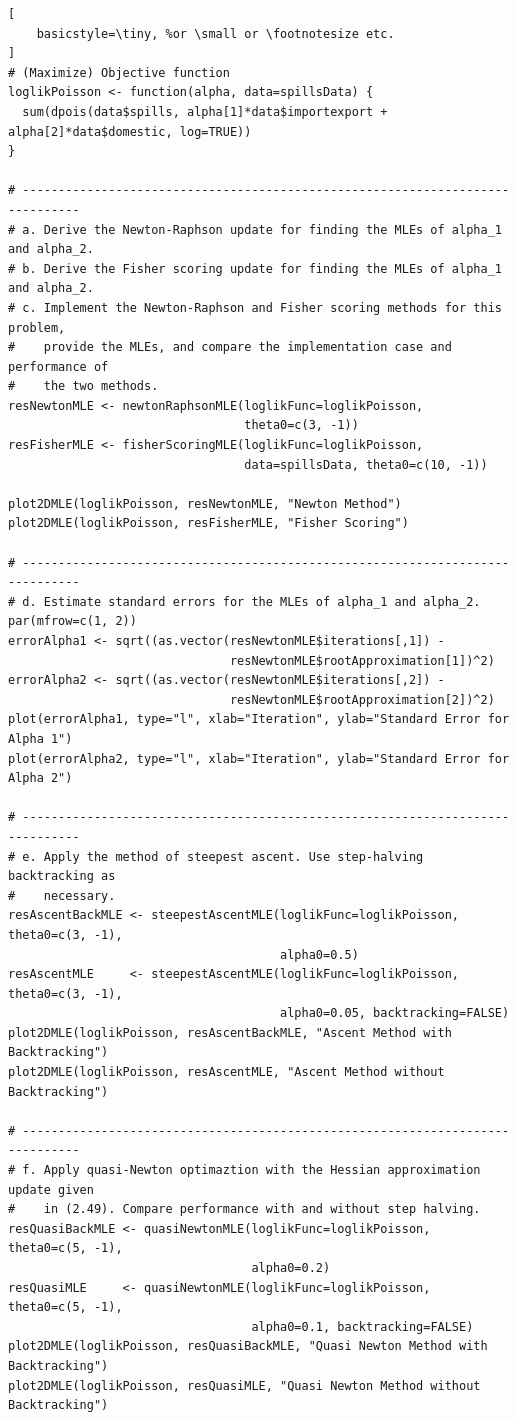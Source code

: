 \begin{appendices}
\begin{lstlisting}[
	basicstyle=\tiny, %or \small or \footnotesize etc.
]
# (Maximize) Objective function
loglikPoisson <- function(alpha, data=spillsData) {
  sum(dpois(data$spills, alpha[1]*data$importexport + alpha[2]*data$domestic, log=TRUE))
}

# ------------------------------------------------------------------------------
# a. Derive the Newton-Raphson update for finding the MLEs of alpha_1 and alpha_2.
# b. Derive the Fisher scoring update for finding the MLEs of alpha_1 and alpha_2.
# c. Implement the Newton-Raphson and Fisher scoring methods for this problem, 
#    provide the MLEs, and compare the implementation case and performance of 
#    the two methods.
resNewtonMLE <- newtonRaphsonMLE(loglikFunc=loglikPoisson, 
                                 theta0=c(3, -1))
resFisherMLE <- fisherScoringMLE(loglikFunc=loglikPoisson, 
                                 data=spillsData, theta0=c(10, -1))

plot2DMLE(loglikPoisson, resNewtonMLE, "Newton Method")
plot2DMLE(loglikPoisson, resFisherMLE, "Fisher Scoring")

# ------------------------------------------------------------------------------
# d. Estimate standard errors for the MLEs of alpha_1 and alpha_2.
par(mfrow=c(1, 2))
errorAlpha1 <- sqrt((as.vector(resNewtonMLE$iterations[,1]) - 
                               resNewtonMLE$rootApproximation[1])^2)
errorAlpha2 <- sqrt((as.vector(resNewtonMLE$iterations[,2]) - 
                               resNewtonMLE$rootApproximation[2])^2)
plot(errorAlpha1, type="l", xlab="Iteration", ylab="Standard Error for Alpha 1")
plot(errorAlpha2, type="l", xlab="Iteration", ylab="Standard Error for Alpha 2")

# ------------------------------------------------------------------------------
# e. Apply the method of steepest ascent. Use step-halving backtracking as
#    necessary.
resAscentBackMLE <- steepestAscentMLE(loglikFunc=loglikPoisson, theta0=c(3, -1), 
                                      alpha0=0.5)
resAscentMLE     <- steepestAscentMLE(loglikFunc=loglikPoisson, theta0=c(3, -1), 
                                      alpha0=0.05, backtracking=FALSE)
plot2DMLE(loglikPoisson, resAscentBackMLE, "Ascent Method with Backtracking")
plot2DMLE(loglikPoisson, resAscentMLE, "Ascent Method without Backtracking")

# ------------------------------------------------------------------------------
# f. Apply quasi-Newton optimaztion with the Hessian approximation update given 
#    in (2.49). Compare performance with and without step halving.
resQuasiBackMLE <- quasiNewtonMLE(loglikFunc=loglikPoisson, theta0=c(5, -1), 
                                  alpha0=0.2)
resQuasiMLE     <- quasiNewtonMLE(loglikFunc=loglikPoisson, theta0=c(5, -1), 
                                  alpha0=0.1, backtracking=FALSE)
plot2DMLE(loglikPoisson, resQuasiBackMLE, "Quasi Newton Method with Backtracking")
plot2DMLE(loglikPoisson, resQuasiMLE, "Quasi Newton Method without Backtracking")


\end{lstlisting}
\end{appendices}
